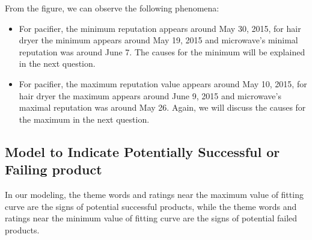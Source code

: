 \documentclass{mcmthesis}
\begin{document}
From the figure, we can observe the following phenomena:
\begin{itemize}
	\item For pacifier, the minimum reputation appears around May 30, 2015, for hair dryer the minimum appears around May 19, 2015 and microwave's minimal reputation was around June 7. The causes for the minimum will be explained in the next question. 
	\item For pacifier, the maximum reputation value appears around May 10, 2015, for hair dryer the maximum appears around June 9, 2015 and microwave's maximal reputation was around May 26. Again, we will discuss the causes for the maximum in the next question.
\end{itemize}

\subsection{Model to Indicate Potentially Successful or Failing product}
In our modeling, the theme words and ratings near the maximum value of fitting curve are the signs of potential successful products, while the theme words and ratings near the minimum value of fitting curve are the signs of potential failed products.
\end{document}
